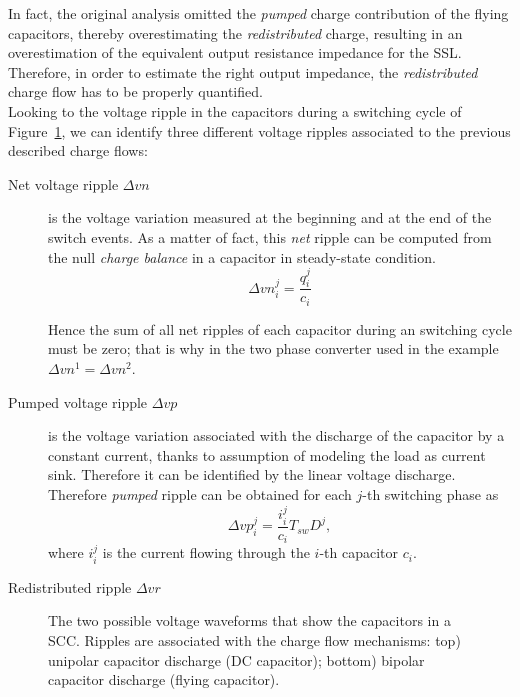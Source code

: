 In fact, the original analysis omitted the \emph{pumped} charge contribution of the flying capacitors, thereby overestimating the \emph{redistributed} charge, resulting in an overestimation of the equivalent output resistance impedance for the SSL. Therefore, in order to estimate the right output impedance, the \emph{redistributed} charge flow has to be properly quantified.\\

Looking to the voltage ripple in the capacitors during a switching cycle of Figure~\ref{fig:cap_riples}, we can identify three different voltage ripples associated to the previous described charge flows:
\begin{description}
  \item[Net voltage ripple $\Delta vn$] is the voltage variation measured at the beginning and at the end of the switch events. As a matter of fact, this \emph{net} ripple can be computed from the null \emph{charge balance} in a capacitor in steady-state condition. 
      \begin{equation}
        \Delta {vn}^j_i  = \frac{q_i ^j }{c_i}
        \label{eq:net_voltage}
      \end{equation}

      
      Hence the sum of all net ripples of each capacitor during an switching cycle  must be zero; that is why in the two phase converter used in the example $\Delta vn^1 = \Delta vn^2$.
  
  \item[Pumped voltage ripple $\Delta vp$] is the voltage variation associated with the discharge of the capacitor by a constant current, thanks to assumption of modeling the load as current sink. Therefore it can be identified by the linear voltage discharge. Therefore \emph{pumped} ripple can be obtained for each $j$-th switching phase as
      \begin{equation}
        \Delta {vp}^j_i  = \frac{i_i^j}{c_i} T_{sw} D^j,
      \label{eq:pumped_voltage}
      \end{equation}
      where $i_i^j$ is the current flowing through the $i$-th capacitor $c_i$.  
  
  \item[Redistributed ripple $\Delta vr$ ]

\end{description}




\begin{figure}[!h]
\centering

\caption{The two possible voltage waveforms that show the capacitors in a SCC. Ripples are associated with the charge flow mechanisms: top) unipolar capacitor discharge (DC capacitor); bottom) bipolar capacitor discharge (flying capacitor).}
\label{fig:cap_riples}
\end{figure}




